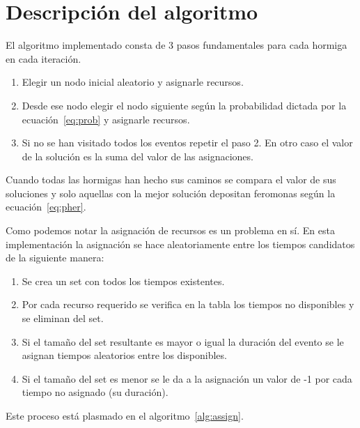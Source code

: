 \documentclass[letter, 10pt]{article}
\begin{document}
\section{Descripción del algoritmo}\label{sec:alg}
El algoritmo implementado consta de 3 pasos fundamentales para cada hormiga en
cada iteración.
\begin{enumerate}
  \item
    Elegir un nodo inicial aleatorio y asignarle recursos.
  \item
    Desde ese nodo elegir el nodo siguiente según la probabilidad dictada por la
    ecuación~\ref{eq:prob} y asignarle recursos.
  \item
    Si no se han visitado todos los eventos repetir el paso 2. En otro caso el
    valor de la solución es la suma del valor de las asignaciones.
\end{enumerate}

Cuando todas las hormigas han hecho sus caminos se compara el valor de sus
soluciones y solo aquellas con la mejor solución depositan feromonas según la
ecuación~\ref{eq:pher}.

Como podemos notar la asignación de recursos es un problema en sí. En esta
implementación la asignación se hace aleatoriamente entre los tiempos
candidatos de la siguiente manera:
\begin{enumerate}
  \item
    Se crea un set con todos los tiempos existentes.
  \item
    Por cada recurso requerido se verifica en la tabla los tiempos no
    disponibles y se eliminan del set.
  \item
    Si el tamaño del set resultante es mayor o igual la duración del evento se
    le asignan tiempos aleatorios entre los disponibles.
  \item
    Si el tamaño del set es menor se le da a la asignación un valor de -1 por
    cada tiempo no asignado (su duración).
\end{enumerate}

Este proceso está plasmado en el algoritmo~\ref{alg:assign}.
\end{document}
